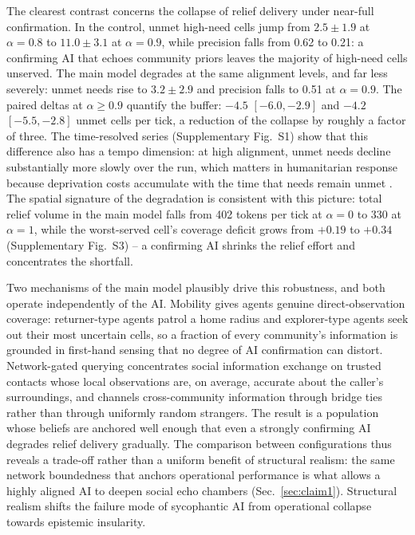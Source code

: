 \documentclass[pdflatex,sn-basic]{sn-jnl}
\begin{document}
The clearest contrast concerns the collapse of relief delivery under near-full confirmation. In the control, unmet high-need cells jump from $2.5 \pm 1.9$ at $\alpha = 0.8$ to $11.0 \pm 3.1$ at $\alpha = 0.9$, while precision falls from 0.62 to 0.21: a confirming AI that echoes community priors leaves the majority of high-need cells unserved. The main model degrades at the same alignment levels, and far less severely: unmet needs rise to $3.2 \pm 2.9$ and precision falls to 0.51 at $\alpha = 0.9$. The paired deltas at $\alpha \geq 0.9$ quantify the buffer: $-4.5$ $[-6.0, -2.9]$ and $-4.2$ $[-5.5, -2.8]$ unmet cells per tick, a reduction of the collapse by roughly a factor of three. The time-resolved series (Supplementary Fig.~S1) show that this difference also has a tempo dimension: at high alignment, unmet needs decline substantially more slowly over the run, which matters in humanitarian response because deprivation costs accumulate with the time that needs remain unmet \citep{holguin2012unique}. The spatial signature of the degradation is consistent with this picture: total relief volume in the main model falls from 402 tokens per tick at $\alpha = 0$ to 330 at $\alpha = 1$, while the worst-served cell's coverage deficit grows from $+0.19$ to $+0.34$ (Supplementary Fig.~S3) -- a confirming AI shrinks the relief effort and concentrates the shortfall.

Two mechanisms of the main model plausibly drive this robustness, and both operate independently of the AI. Mobility gives agents genuine direct-observation coverage: returner-type agents patrol a home radius and explorer-type agents seek out their most uncertain cells, so a fraction of every community's information is grounded in first-hand sensing that no degree of AI confirmation can distort. Network-gated querying concentrates social information exchange on trusted contacts whose local observations are, on average, accurate about the caller's surroundings, and channels cross-community information through bridge ties rather than through uniformly random strangers. The result is a population whose beliefs are anchored well enough that even a strongly confirming AI degrades relief delivery gradually. The comparison between configurations thus reveals a trade-off rather than a uniform benefit of structural realism: the same network boundedness that anchors operational performance is what allows a highly aligned AI to deepen social echo chambers (Sec.~\ref{sec:claim1}). Structural realism shifts the failure mode of sycophantic AI from operational collapse towards epistemic insularity.
\end{document}
